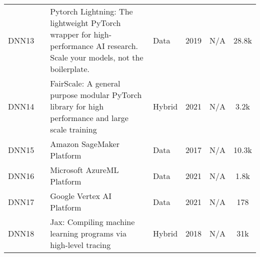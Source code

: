 \begin{table*}[th!]
\begin{tabular}{llp{8.4cm}lllc}
		\small DNN13       & \small \cite{noauthor_overview_nodate}  & \small Pytorch Lightning: The lightweight PyTorch wrapper for high-performance AI research. Scale your models, not the boilerplate. & \small Data          & \small 2019          & \small N/A                & \small 28.8k \cite{falcon_pytorch_2019}                              \\[1ex]
		\small DNN14       & \small \cite{noauthor_fairscale_nodate} & \small FairScale:  A general purpose modular PyTorch library for high performance and large scale training                          & \small Hybrid        & \small 2021          & \small N/A                & \small 3.2k \cite{FairScale2021}                                     \\[1ex]
		\small DNN15       & \small \cite{noauthor_amazon_nodate}    & \small Amazon SageMaker Platform                                                                                                    & \small Data          & \small 2017          & \small N/A                & \small 10.3k \cite{noauthor_awsamazon-sagemaker-examples_2025}       \\[1ex]
		\small DNN16       & \small \cite{sdgilley_azure_nodate}     & \small Microsoft AzureML Platform                                                                                                   & \small Data          & \small 2021          & \small N/A                & \small 1.8k \cite{noauthor_azureazureml-examples_2025}               \\[1ex]
		\small DNN17       & \small \cite{noauthor_vertex_nodate}    & \small Google Vertex AI Platform                                                                                                    & \small Data          & \small 2021          & \small N/A                & \small 178 \cite{noauthor_googlecloudplatformvertex-ai-samples_2025} \\[1ex]
		\small DNN18       & \small \cite{frostig_compiling_nodate}  & \small Jax: Compiling machine learning programs via high-level tracing                                                              & \small Hybrid        & \small 2018          & \small N/A                & \small 31k \cite{noauthor_jax-mljax_2025}                            \\[1ex]
		\hline
	\end{tabular}
\end{table*}
